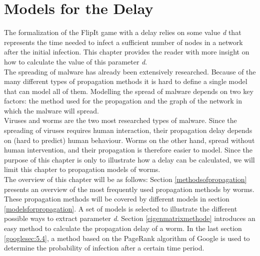 \chapter{Models for the Delay}
\label{chapter4: Worm propagation}



The formalization of the FlipIt game with a delay relies on some value  \textit{d} that represents the time needed to infect a sufficient number of nodes in a network after the initial infection. This chapter provides the reader with more insight on how to calculate the value of this parameter \textit{d}.  \\

The spreading of malware has already been extensively researched. Because of the many different types of propagation methods it is hard to define a single model that can model all of them. Modelling the spread of malware depends on two key factors: the method used for the propagation and the graph of the network in which the malware will spread. \\
Viruses and worms are the two most researched types of malware.
 Since the spreading of viruses requires human interaction, their propagation delay depends on (hard to predict) human behaviour. Worms on the other hand, spread without human intervention, and their propagation is therefore easier to model. Since the purpose of this chapter is only to illustrate how a delay can be calculated, we will limit this chapter to propagation models of worms. \\

The overview of this chapter will be as follows: Section \ref{methodsofpropagation} presents an overview of the most frequently used propagation methods by worms. These propagation methods will be covered by different models in section \ref{modelsforpropagation}. A set of models is selected to illustrate the different possible ways to extract parameter \textit{d}. Section \ref{eigenmatrixmethode} introduces an easy method to calculate the propagation delay of a worm. In the last section \ref{googlesec:5.4}, a method based on the PageRank algorithm of Google is used to determine the probability of infection after a certain time period.%



